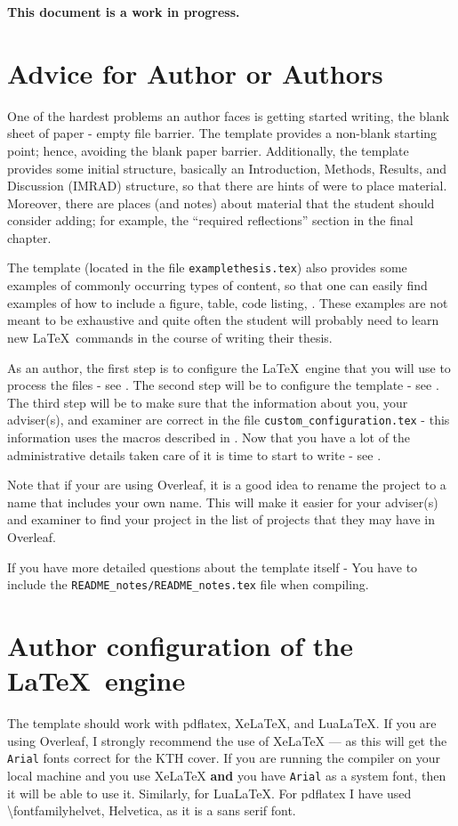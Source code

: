 \documentclass[examplethesis.tex]{subfiles}
\begin{document}
\noindent\textbf{This document is a work in progress.}


\section{Advice for Author or Authors}
\label{sec:authors}
One of the hardest problems an author faces is getting started writing, \ie the blank sheet of paper - empty file barrier. The template provides a \mbox{non-blank} starting point; hence, avoiding the blank paper barrier. Additionally, the template provides some initial structure, basically an Introduction, Methods, Results, and Discussion (IMRAD) structure, so that there are hints of were to place material. Moreover, there are places (and notes) about material that the student should consider adding; for example, the ``required reflections'' section in the final chapter.

The template (located in the file \texttt{examplethesis.tex}) also provides some examples of commonly occurring types of content, so that one can easily find examples of how to include a figure, table, code listing, \etc. These examples are not meant to be exhaustive and quite often the student will probably need to learn new \LaTeX\ commands in the course of writing their thesis.

As an author, the first step is to configure the \LaTeX\ engine that you will use to process the files - see . The second step will be to configure the template - see . The third step will be to make sure that the information about you, your adviser(s), and examiner are correct in the file \texttt{custom\_configuration.tex} - this information uses the macros described in . Now that you have a lot of the administrative details taken care of it is time to start to write - see .

Note that if your are using Overleaf, it is a good idea to rename the project to a name that includes your own name. This will make it easier for your adviser(s) and examiner to find your project in the list of projects that they may have in Overleaf.


If you have more detailed questions about the template itself - 
{You have to include the \texttt{README\_notes/README\_notes.tex} file when compiling.}

\section{Author configuration of the \LaTeX\ engine}
\label{sec:latexEngine}
The template should work with pdflatex, XeLaTeX, and LuaLaTeX.  If you are using Overleaf, I strongly recommend the use of XeLaTeX ---  as this will get the \texttt{Arial} fonts correct for the KTH cover. If you are running the compiler on your local machine and you use XeLaTeX \textbf{and} you have \texttt{Arial} as a system font, then it will be able to use it. Similarly, for LuaLaTeX. For pdflatex I have used \textbackslash fontfamily{helvet}, \ie Helvetica, as it is a sans serif font.
\end{document}
